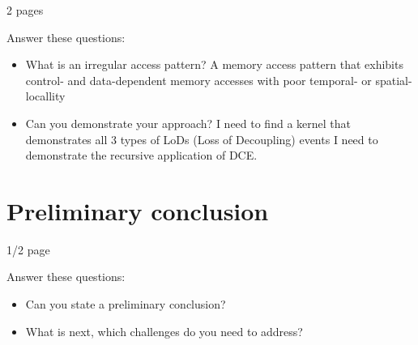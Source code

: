 \documentclass{acaces}
\begin{document}
2 pages

Answer these questions:
\begin{itemize}
\item What is an irregular access pattern?
      A memory access pattern that exhibits control- and data-dependent memory accesses with poor temporal- or spatial-locallity
\item Can you demonstrate your approach?
      I need to find a kernel that demonstrates all 3 types of LoDs (Loss of Decoupling) events \cite{bird_effectiveness_1993}
      I need to demonstrate the recursive application of DCE.
\end{itemize}

\section{Preliminary conclusion}

1/2 page

Answer these questions:
\begin{itemize}
\item Can you state a preliminary conclusion?
\item What is next, which challenges do you need to address?
\end{itemize}


\end{document}
